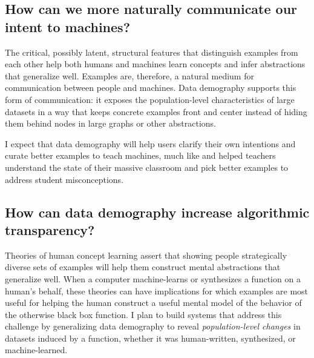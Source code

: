\documentclass[justified]{tufte-handout}
\begin{document}
\subsection*{How can we more naturally communicate our intent to machines?}
The critical, possibly latent, structural features that distinguish examples from each other help both humans and machines learn concepts and infer abstractions that generalize well. Examples are, therefore, a natural medium for communication between people and machines.
Data demography supports this form of communication: it exposes the population-level characteristics of large datasets in a way that keeps concrete examples front and center instead of hiding them behind nodes in large graphs or other abstractions. 

I expect that data demography will help users clarify their own intentions\cite{vule} and curate better examples to teach machines, much like \cite{overcode} and \cite{foobaz} helped teachers understand the state of their massive classroom and pick better examples to address student misconceptions.


\subsection*{How can data demography increase algorithmic transparency?}

Theories of human concept learning assert that showing people strategically diverse sets of examples will help them construct mental abstractions that generalize well.\cite{vt} When a computer machine-learns or synthesizes a function on a human's behalf, these theories can have implications for which examples are most useful for helping the human construct a useful mental model of the behavior of the otherwise black box function. I plan to build systems that address this challenge by generalizing data demography to reveal \emph{population-level changes} in datasets induced by a function, whether it was human-written, synthesized, or machine-learned. %
\end{document}
